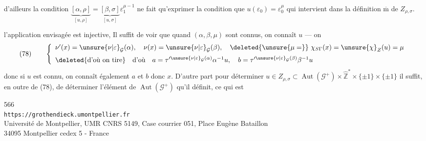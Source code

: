 
 d'ailleurs la condition
$\underbrace{[\alpha,\rho]}_{[u,\rho]}=\underbrace{[\beta,\sigma]}_{[u,\sigma]}\varepsilon_{1}^{\mu-1}$ 
ne fait qu'exprimer la condition que $u(\varepsilon_{0})=\varepsilon_{0}^{\mu}$ qui intervient dans la définition $\overline{\mathrm m}$ de $Z_{\rho,\sigma}$.

  l'application envisagée  est injective,  Il suffit de voir que quand $(\alpha,\beta,\mu)$ sont connus, on connaît $u$ ---  on  
\[
\text{(78)}\qquad
\left\{\begin{array}{l}
\nu'(x)=\unsure{\nu|\varepsilon}_{\mathcal{G}}(\alpha),\quad
\nu(x)=\unsure{\nu|\varepsilon}_{\mathcal{G}}(\beta),\quad
\deleted{\unsure{\mu=}}\ \chi_{S\Gamma}(x)=\unsure{\chi}_{Z}(u)=\mu\\[0.6em]
\deleted{\text{d'où on tire}}\quad\text{d'où}\quad
a=\tau'^{\unsure{\nu|\varepsilon}_{\mathcal{G}}(\alpha)}\alpha^{-1}u,\quad
b=\tau'^{\unsure{\nu|\varepsilon}_{\mathcal{G}}(\beta)}\beta^{-1}u
\end{array}\right.
\]
 donc si $u$ est connu, on connaît également $a$ et $b$ donc $x$. D'autre part pour déterminer  $u\in Z_{\rho,\sigma}\subset\operatorname{Aut}(\mathcal{G}^{+})\times\widehat{\mathbb Z}^{*}\times\{\pm1\}\times\{\pm1\}$ il suffit, en outre de (78), de  déterminer  l'élément de $\operatorname{Aut}(\mathcal{G}^{+})$ qu'il définit, ce qui est


{\small
\begin{center}
566\\
\texttt{https://grothendieck.umontpellier.fr}\\
Université de Montpellier, UMR CNRS 5149, Case courrier 051, Place Eugène Bataillon\\
34095 Montpellier cedex 5 - France
\end{center}
}
